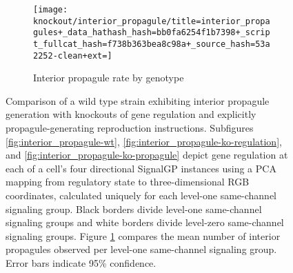 \begin{figure}[!htbp]
\begin{center}
\hspace*{\fill}%
\begin{minipage}[t]{\columnwidth}
\centering
\vspace{0pt} %
\begin{subfigure}[b]{\textwidth}
\texttt{[image: knockout/interior\_propagule/title=interior\_propagules+\_data\_hathash\_hash=bb0fa6254f1b7398+\_script\_fullcat\_hash=f738b363bea8c98a+\_source\_hash=53a2252-clean+ext=]}%
\caption{Interior propagule rate by genotype}
\label{fig:interior_propagule_rate}
\end{subfigure}
\end{minipage}%
\hspace*{\fill}


\caption{
Comparison of a wild type strain exhibiting interior propagule generation with knockouts of gene regulation and explicitly propagule-generating reproduction instructions.
Subfigures \ref{fig:interior_propagule-wt}, \ref{fig:interior_propagule-ko-regulation}, and \ref{fig:interior_propagule-ko-propagule} depict gene regulation at each of a cell's four directional SignalGP instances using a PCA mapping from regulatory state to three-dimensional RGB coordinates, calculated uniquely for each level-one same-channel signaling group.
Black borders divide level-one same-channel signaling groups and white borders divide level-zero same-channel signaling groups.
Figure \ref{fig:interior_propagule_rate} compares the mean number of interior propagules observed per level-one same-channel signaling group.
Error bars indicate 95\% confidence.
}
\label{fig:ko-interior_propagule}
\end{center}
\end{figure}
